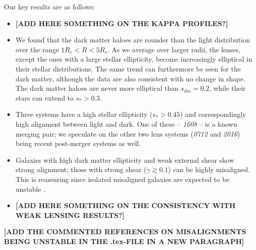 \documentclass[useAMS,usenatbib]{mn2e}
\begin{document}
Our key results are as follows:

\begin{itemize}
\item \textbf{[ADD HERE SOMETHING ON THE KAPPA PROFILES?]}

\item We found that the dark matter haloes are rounder than the light distribution over the range $1R_e < R < 5R_e$. As we average over larger radii, the lenses, except the ones with a large stellar ellipticity, become increasingly elliptical in their stellar distributions. The same trend can furthermore be seen for the dark matter, although the data are also consistent with no change in shape. The dark matter haloes are never more elliptical than $s_{dm} = 0.2$, while their stars can extend to $s_* > 0.3$.

\item Three systems have a high stellar ellipticity ($s_* > 0.45$) and correspondingly high alignment between light and dark. One of these -- {\it1608} -- is a known merging pair; we speculate on the other two lens systems ({\it0712} and {\it2016}) being recent post-merger systems as well. 

\item Galaxies with high dark matter ellipticity and weak external shear show strong alignment; those with strong shear ($\gamma \gtrsim 0.1$) can be highly misaligned. This is reassuring since isolated misaligned galaxies are expected to be unstable \citep[e.g.][]{1979ApJ...233..872H,1988A&A...206..269M,2007ApJ...670.1027A,2015arXiv150203429D}.

\item \textbf{[ADD HERE SOMETHING ON THE CONSISTENCY WITH WEAK LENSING RESULTS?]}

\end{itemize}

\textbf{[ADD THE COMMENTED REFERENCES ON MISALIGNMENTS BEING UNSTABLE IN THE .tex-FILE IN A NEW PARAGRAPH]}
\end{document}
